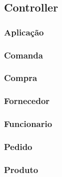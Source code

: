 
\subsection{Controller}
\subsubsection{Aplicação}

\subsubsection{Comanda}

\subsubsection{Compra}

\subsubsection{Fornecedor}

\subsubsection{Funcionario}

\subsubsection{Pedido}

\subsubsection{Produto}
